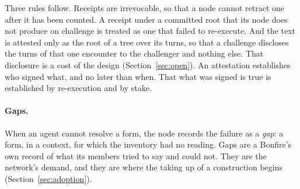 Three rules follow. Receipts are irrevocable, so that a node cannot retract one after it has been counted. A
receipt under a committed root that its node does not produce on challenge is treated as one that failed to
re-execute. And the text is attested only as the root of a tree over its turns, so that a challenge discloses the
turns of that one encounter to the challenger and nothing else. That disclosure is a cost of the design
(Section~\ref{sec:open}). An attestation establishes who signed what, and no later than when. That what was signed
is true is established by re-execution and by stake.

\paragraph{Gaps.} When an agent cannot resolve a form, the node records the failure as a \emph{gap}: a form, in a
context, for which the inventory had no reading. Gaps are a Bonfire's own record of what its members tried to say
and could not. They are the network's demand, and they are where the taking up of a construction begins
(Section~\ref{sec:adoption}).
